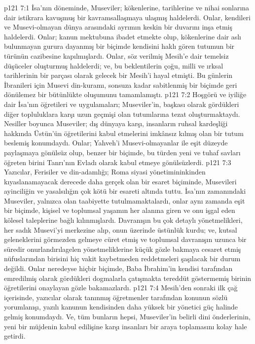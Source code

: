 \vs p121 7:1 İsa’nın döneminde, Museviler; kökenlerine, tarihlerine ve nihai sonlarına dair istikrara kavuşmuş bir kavramsallaşmaya ulaşmış haldelerdi. Onlar, kendileri ve Musevi\hyp{}olmayan dünya arasındaki ayrımın keskin bir duvarını inşa etmiş haldelerdi. Onlar; kanun mektubuna ibadet etmekte olup, kökenlerine dair aslı bulunmayan gurura dayanmış bir biçimde kendisini haklı gören tutumun bir türünün cazibesine kapılmışlardı. Onlar, söz verilmiş Mesih’e dair temelsiz düşüceler oluşturmuş haldelerdi; ve, bu beklentilerin çoğu, milli ve ırksal tarihlerinin bir parçası olarak gelecek bir Mesih’i hayal etmişti. Bu günlerin İbranileri için Musevi din\hyp{}kuramı, sonsuza kadar sabitlenmiş bir biçimde geri dönülemez bir bütünlükte oluşumunu tamamlamıştı.
\vs p121 7:2 Hoşgörü ve iyiliğe dair İsa’nın öğretileri ve uygulamaları; Museviler’in, başkası olarak gördükleri diğer topluluklara karşı uzun geçmişi olan tutumlarına tezat oluşturmaktaydı. Nesiller boyunca Museviler; dış dünyaya karşı, insanların ruhsal kardeşliği hakkında Üstün’ün öğretilerini kabul etmelerini imkânsız kılmış olan bir tutum beslemiş konumdaydı. Onlar; Yahveh’i Musevi\hyp{}olmayanlar ile eşit düzeyde paylaşmaya gönülsüz olup, benzer bir biçimde, bu türden yeni ve tuhaf savları öğreten birini Tanrı’nın Evladı olarak kabul etmeye gönülsüzlerdi.
\vs p121 7:3 Yazıcılar, Ferisiler ve din\hyp{}adamlığı; Roma siyasi yönetimininkinden kıyaslanamayacak derecede daha gerçek olan bir esaret biçiminde, Musevileri ayinciliğin ve yasalsılığın çok kötü bir esareti altında tuttu. İsa’nın zamanındaki Museviler, yalnızca  olan taabiyette tutulmamaktalardı, onlar aynı zamanda eşit bir biçimde, kişisel ve toplumsal yaşamın her alanına giren ve onu işgal eden  kölesel taleplerine bağlı kılınmışlardı. Davranışın bu çok detaylı yönetmelikleri, her sadık Musevi’yi merkezine alıp, onun üzerinde üstünlük kurdu; ve, kutsal geleneklerini görmezden gelmeye cüret etmiş ve toplumsal davranışın uzunca bir süredir onurlandırılagelen yönetmeliklerine küçük gözle bakmaya cesaret etmiş nüfuslarından birisini hiç vakit kaybetmeden reddetmeleri şaşılacak bir durum değildi. Onlar neredeyse hiçbir biçimde, Baba İbrahim’in kendisi tarafından emredilmiş olarak gördükleri dogmalarla çatışmakta tereddüt göstermemiş birinin öğretilerini onaylayan gözle bakamazlardı.
\vs p121 7:4 Mesih’den sonraki ilk çağ içerisinde, yazıcılar olarak tanınmış öğretmenler tarafından konunun sözlü yorumlanışı, yazılı kanunun kendisinden daha yüksek bir yönetici güç halinde gelmiş konumdaydı. Ve, tüm bunların hepsi, Museviler’in belirli dini önderlerinin, yeni bir müjdenin kabul edilişine karşı insanları bir araya toplamasını kolay hale getirdi.
